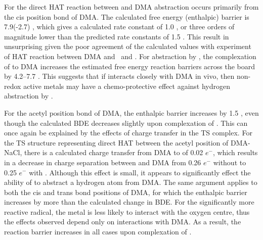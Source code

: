 \begin{doublespace}
For the direct HAT reaction between  and DMA abstraction occurs
primarily from the cis position  bond of DMA. The calculated free energy
(enthalpic) barrier is 7.9(-2.7) \kcalmol, which gives a calculated rate
constant of 1.0  \Ms, or three orders of magnitude lower than the predicted
rate constants of 1.5  \Ms. This result in unsurprising given the poor
agreement of the calculated values with experiment of HAT reaction between DMA
and \bno\ and \cumo. For abstraction by , the complexation of 
to DMA increases the estimated free energy reaction barriers across the board by
4.2--7.7 \kcalmol. This suggests that if  interacts closely with DMA in
vivo, then non-redox active metals may have a chemo-protective effect against
hydrogen abstraction by .

For the acetyl position  bond of DMA, the enthalpic barrier increases by
1.5 \kcalmol, even though the calculated BDE decreases slightly upon
complexation of . This can once again be explained by the effects of
charge transfer in the TS complex. For the TS structure representing direct HAT
between  the acetyl position of DMA-NaCl, there is a calculated charge
transfer from DMA to  of 0.02 $e^-$, which results in a decrease in
charge separation between  and DMA from 0.26 $e^-$ without  to
0.25 $e^-$ with . Although this effect is small, it appears to
significantly effect the ability of  to abstract a hydrogen atom from
DMA. The same argument applies to both the cis and trans  bond positions
of DMA, for which the enthalpic barrier increases by more than the calculated
change in BDE. For the significantly more reactive  radical, the metal
is less likely to interact with the oxygen centre, thus the effects observed
depend only on interactions with DMA. As a result, the reaction barrier
increases in all cases upon complexation of .

\end{doublespace}
